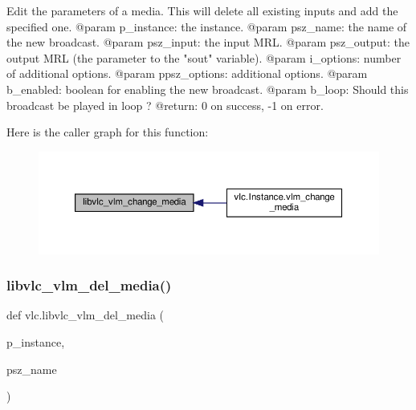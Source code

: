 \begin{DoxyVerb}Edit the parameters of a media. This will delete all existing inputs and
add the specified one.
@param p_instance: the instance.
@param psz_name: the name of the new broadcast.
@param psz_input: the input MRL.
@param psz_output: the output MRL (the parameter to the "sout" variable).
@param i_options: number of additional options.
@param ppsz_options: additional options.
@param b_enabled: boolean for enabling the new broadcast.
@param b_loop: Should this broadcast be played in loop ?
@return: 0 on success, -1 on error.
\end{DoxyVerb}
 Here is the caller graph for this function\+:
\nopagebreak
\begin{figure}[H]
\begin{center}
\leavevmode
\includegraphics[width=350pt]{namespacevlc_ad4124336e48ffb5c6aef3bd166c3ff77_icgraph}
\end{center}
\end{figure}
\mbox{\label{namespacevlc_a7142455eda42a304940d0c22450ede79}} 
\subsubsection{\texorpdfstring{libvlc\+\_\+vlm\+\_\+del\+\_\+media()}{libvlc\_vlm\_del\_media()}}
{\footnotesize\ttfamily def vlc.\+libvlc\+\_\+vlm\+\_\+del\+\_\+media (\begin{DoxyParamCaption}\item[{}]{p\+\_\+instance,  }\item[{}]{psz\+\_\+name }\end{DoxyParamCaption})}

